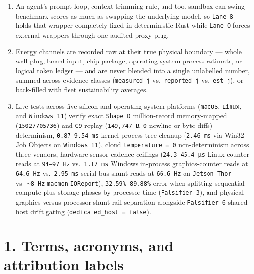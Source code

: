 \documentclass[10pt,letterpaper]{article}
\providecommand{\tightlist}{\setlength{\itemsep}{1pt}\setlength{\parskip}{0pt}}
\begin{document}
\begin{enumerate}
\def\labelenumi{\arabic{enumi}.}
\tightlist
\item
  An agent's prompt loop, context-trimming rule, and tool sandbox can
  swing benchmark scores as much as swapping the underlying model, so
  \texttt{Lane\ B} holds that wrapper completely fixed in deterministic
  Rust while \texttt{Lane\ O} forces external wrappers through one
  audited proxy plug.
\item
  Energy channels are recorded raw at their true physical boundary ---
  whole wall plug, board input, chip package, operating-system process
  estimate, or logical token ledger --- and are never blended into a
  single unlabelled number, summed across evidence classes
  (\texttt{measured\_\allowbreak{}j} vs.~\texttt{reported\_\allowbreak{}j} vs.~\texttt{est\_j}),
  or back-filled with fleet sustainability averages.
\item
  Live tests across five silicon and operating-system platforms
  (\texttt{macOS}, \texttt{Linux}, and \texttt{Windows\ 11}) verify
  exact \texttt{Shape\ D} million-record memory-mapped
  (\texttt{15027705736}) and \texttt{C9} replay (\texttt{149,\allowbreak{}747\ B},
  \texttt{0} newline or byte diffs) determinism, \texttt{0.\allowbreak{}87–9.\allowbreak{}54\ ms}
  kernel process-tree cleanup (\texttt{2.46\ ms} via Win32 Job Objects
  on \texttt{Windows\ 11}), cloud \texttt{temperature\ =\ 0}
  non-determinism across three vendors, hardware sensor cadence ceilings
  (\texttt{24.\allowbreak{}3–45.\allowbreak{}4\ µs} Linux counter reads at \texttt{94–97\ Hz}
  vs.~\texttt{1.17\ ms} Windows in-process graphics-counter reads at
  \texttt{64.6\ Hz} vs.~\texttt{2.95\ ms} serial-bus shunt reads at
  \texttt{66.6\ Hz} on \texttt{Jetson\ Thor}
  vs.~\texttt{\textasciitilde{}8\ Hz} \texttt{macmon}
  \texttt{IOReport}), \texttt{32.\allowbreak{}59\%–89.\allowbreak{}88\%} error when splitting
  sequential compute-plus-storage phases by processor time
  (\texttt{Falsifier\ 3}), and physical graphics-versus-processor shunt
  rail separation alongside \texttt{Falsifier\ 6} shared-host drift
  gating (\texttt{dedicated\_\allowbreak{}host\ =\ false}).
\end{enumerate}

\section{1. Terms, acronyms, and attribution
labels}\label{terms-acronyms-and-attribution-labels}
\end{document}
